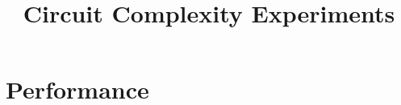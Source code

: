 \documentclass[conference]{IEEEtran}
\begin{document}
\title{Circuit Complexity Experiments}
\author{}
\maketitle
\section{Performance}

\clearpage
\end{document}
